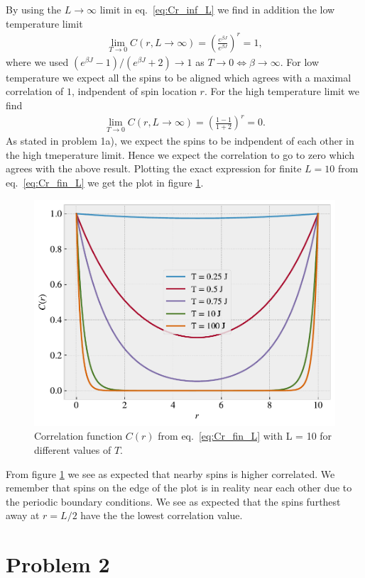 \documentclass[reprint, amsmath, amssymb, aps, onecolumn]{revtex4-2}
\begin{document}
By using the $L\to\infty$ limit in eq.~\eqref{eq:Cr_inf_L} we find in addition the low temperature limit
\begin{align*}
  \lim_{T\to0} C(r, L \to \infty) = \left(\frac{e^{\beta J}}{e^{\beta J}}\right)^r = 1,
\end{align*}
where we used $(e^{\beta J} - 1)/(e^{\beta J} + 2) \to 1$ as $T\to0 \Leftrightarrow \beta \to \infty$. For low temperature we expect all the spins to be aligned which agrees with a maximal correlation of $1$, indpendent of spin location $r$. For the high temperature limit we find 
\begin{align*}
  \lim_{T\to0} C(r, L \to \infty) = \left(\frac{1 - 1}{1 + 2}\right)^r = 0.
\end{align*}
As stated in problem 1a), we expect the spins to be indpendent of each other in the high tmeperature limit. Hence we expect the correlation to go to zero which agrees with the above result. Plotting the exact expression for finite $L = 10$ from eq.~\eqref{eq:Cr_fin_L} we get the plot in figure \ref{fig:Cr_fin_L}.
\begin{figure}[H]
  \centering
  \includegraphics[width=0.6\linewidth]{figures/Cr_L10.pdf}
  \caption{Correlation function $C(r)$ from eq.~\eqref{eq:Cr_fin_L} with L = 10 for different values of $T$. }
  \label{fig:Cr_fin_L}
\end{figure}
From figure \ref{fig:Cr_fin_L} we see as expected that nearby spins is higher correlated. We remember that spins on the edge of the plot is in reality near each other due to the periodic boundary conditions. We see as expected that the spins furthest away at $r = L/2$ have the the lowest correlation value. 
\clearpage
%
%
\section*{Problem 2}
\end{document}
